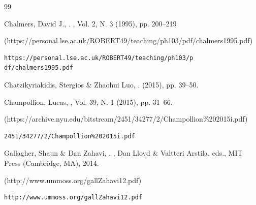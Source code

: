 \begin{thebibliography}{99}
{\begin{bItem}[DavidJChalmers]
Chalmers, David J.,   
.
, 
Vol. 2, N. 3 (1995), pp. 200--219
%
\begin{boxurl}(https://personal.lse.ac.uk/ROBERT49/teaching/ph103/pdf/chalmers1995.pdf)
\begin{lstlisting}
https://personal.lse.ac.uk/ROBERT49/teaching/ph103/p
df/chalmers1995.pdf
\end{lstlisting}
\end{boxurl}\end{bItem}





\begin{bItem}[ChatzikyriakidisLuo]
Chatzikyriakidis, Stergios \& Zhaohui Luo, 
.
 (2015), pp. 39--50. 
%
\end{bItem}



\begin{bItem}[LucasChampollion]
Champollion, Lucas,%
{}
, Vol. 39, N. 1 (2015), 
pp. 31--66. 
%
\begin{boxurl}(https://archive.nyu.edu/bitstream/2451/34277/2/Champollion\%202015i.pdf)
\begin{lstlisting}
2451/34277/2/Champollion%202015i.pdf
\end{lstlisting}
\end{boxurl}\end{bItem}




\begin{bItem}[GallagherZahavi]
Gallagher, Shaun \& Dan Zahavi,%
{}.
,
Dan Lloyd \& Valtteri Arstila, eds., MIT Press (Cambridge, MA), 2014.
%
\begin{boxurl}(http://www.ummoss.org/gallZahavi12.pdf)
\begin{lstlisting}
http://www.ummoss.org/gallZahavi12.pdf
\end{lstlisting}
\end{boxurl}\end{bItem}



}
\end{thebibliography}
